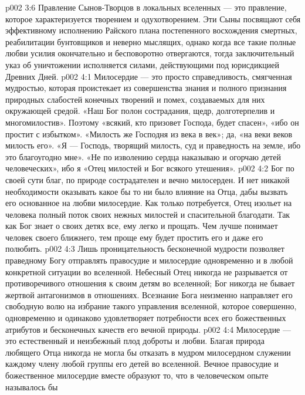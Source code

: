 \vs p002 3:6 Правление Сынов\hyp{}Творцов в локальных вселенных --- это правление, которое характеризуется творением и одухотворением. Эти Сыны посвящают себя эффективному исполнению Райского плана постепенного восхождения смертных, реабилитации бунтовщиков и неверно мыслящих, однако когда все такие полные любви усилия окончательно и бесповоротно отвергаются, тогда заключительный указ об уничтожении исполняется силами, действующими под юрисдикцией Древних Дней.
\vs p002 4:1 Милосердие --- это просто справедливость, смягченная мудростью, которая проистекает из совершенства знания и полного признания природных слабостей конечных творений и помех, создаваемых для них окружающей средой. «Наш Бог полон сострадания, щедр, долготерпелив и многомилостив». Поэтому «всякий, кто призовет Господа, будет спасен», «ибо он простит с избытком». «Милость же Господня из века в век»; да, «на веки веков милость его». «Я --- Господь, творящий милость, суд и праведность на земле, ибо это благоугодно мне». «Не по изволению сердца наказываю и огорчаю детей человеческих», ибо я «Отец милостей и Бог всякого утешения».
\vs p002 4:2 Бог по своей сути благ, по природе сострадателен и вечно милосерден. И нет никакой необходимости оказывать какое бы то ни было влияние на Отца, дабы вызвать его основанное на любви милосердие. Как только потребуется, Отец изольет на человека полный поток своих нежных милостей и спасительной благодати. Так как Бог знает о своих детях все, ему легко и прощать. Чем лучше понимает человек своего ближнего, тем проще ему будет простить его и даже его полюбить.
\vs p002 4:3 \pc Лишь проницательность бесконечной мудрости позволяет праведному Богу отправлять правосудие и милосердие одновременно и в любой конкретной ситуации во вселенной. Небесный Отец никогда не разрывается от противоречивого отношения к своим детям во вселенной; Бог никогда не бывает жертвой антагонизмов в отношениях. Всезнание Бога неизменно направляет его свободную волю на избрание такого управления вселенной, которое совершенно, одновременно и одинаково удовлетворяет потребности всех его божественных атрибутов и бесконечных качеств его вечной природы.
\vs p002 4:4 Милосердие --- это естественный и неизбежный плод доброты и любви. Благая природа любящего Отца никогда не могла бы отказать в мудром милосердном служении каждому члену любой группы его детей во вселенной. Вечное правосудие и божественное милосердие вместе образуют то, что в человеческом опыте называлось бы 
